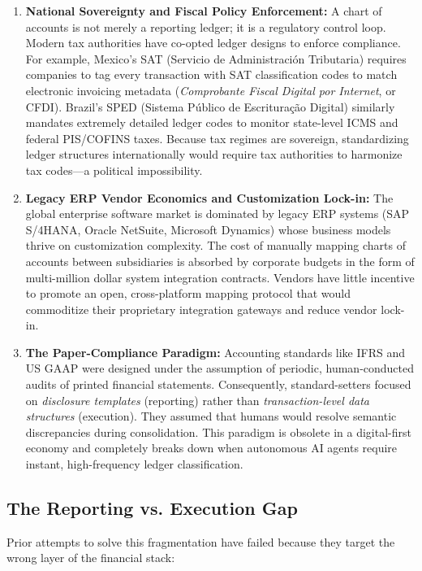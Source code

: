 \begin{enumerate}
    \item \textbf{National Sovereignty and Fiscal Policy Enforcement:} A chart of accounts is not merely a reporting ledger; it is a regulatory control loop. Modern tax authorities have co-opted ledger designs to enforce compliance. For example, Mexico's SAT (Servicio de Administración Tributaria) requires companies to tag every transaction with SAT classification codes to match electronic invoicing metadata (\textit{Comprobante Fiscal Digital por Internet}, or CFDI). Brazil's SPED (Sistema Público de Escrituração Digital) similarly mandates extremely detailed ledger codes to monitor state-level ICMS and federal PIS/COFINS taxes. Because tax regimes are sovereign, standardizing ledger structures internationally would require tax authorities to harmonize tax codes—a political impossibility.
    \item \textbf{Legacy ERP Vendor Economics and Customization Lock-in:} The global enterprise software market is dominated by legacy ERP systems (SAP S/4HANA, Oracle NetSuite, Microsoft Dynamics) whose business models thrive on customization complexity. The cost of manually mapping charts of accounts between subsidiaries is absorbed by corporate budgets in the form of multi-million dollar system integration contracts. Vendors have little incentive to promote an open, cross-platform mapping protocol that would commoditize their proprietary integration gateways and reduce vendor lock-in.
    \item \textbf{The Paper-Compliance Paradigm:} Accounting standards like IFRS and US GAAP were designed under the assumption of periodic, human-conducted audits of printed financial statements. Consequently, standard-setters focused on \textit{disclosure templates} (reporting) rather than \textit{transaction-level data structures} (execution). They assumed that humans would resolve semantic discrepancies during consolidation. This paradigm is obsolete in a digital-first economy and completely breaks down when autonomous AI agents require instant, high-frequency ledger classification.
\end{enumerate}

\subsection{The Reporting vs. Execution Gap}
Prior attempts to solve this fragmentation have failed because they target the wrong layer of the financial stack:

